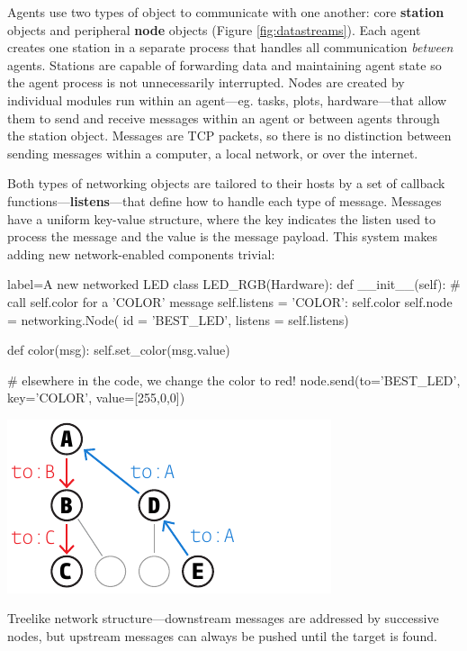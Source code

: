 \documentclass[nohyper, justified, notitlepage, marginals=raggedright,twoside=false,debug]{tufte-autopilot}
\begin{document}
Agents use two types of object to communicate with one another: core \textbf{station} objects and peripheral \textbf{node} objects (Figure \ref{fig:datastreams}). Each agent creates one station in a separate process that handles all communication \textit{between} agents. Stations are capable of forwarding data and maintaining agent state so the agent process is not unnecessarily interrupted. Nodes are created by individual modules run within an agent---eg. tasks, plots, hardware---that allow them to send and receive messages within an agent or between agents through the station object. Messages are TCP packets, so there is no distinction between sending messages within a computer, a local network, or over the internet.

Both types of networking objects are tailored to their hosts by a set of callback functions---\textbf{listens}---that define how to handle each type of message. Messages have a uniform key-value structure, where the key indicates the listen used to process the message and the value is the message payload. This system makes adding new network-enabled components trivial:

\begin{pythoncode*}{label=A new networked LED}
class LED_RGB(Hardware):
    def __init__(self):
        # call self.color for a 'COLOR' message
        self.listens = {'COLOR': self.color}
        self.node = networking.Node(
            id      = 'BEST_LED',
            listens = self.listens)
        
    def color(msg):
        self.set_color(msg.value)
        
# elsewhere in the code, we change the color to red!
node.send(to='BEST_LED', key='COLOR', value=[255,0,0])
\end{pythoncode*}

\begin{marginfigure}[2.4cm]
\includegraphics[]{figures/side_25_tree.pdf}
\caption{Treelike network structure---downstream messages are addressed by successive nodes, but upstream messages can always be pushed until the target is found.}
\label{fig:nettree}
\end{marginfigure}
\end{document}
